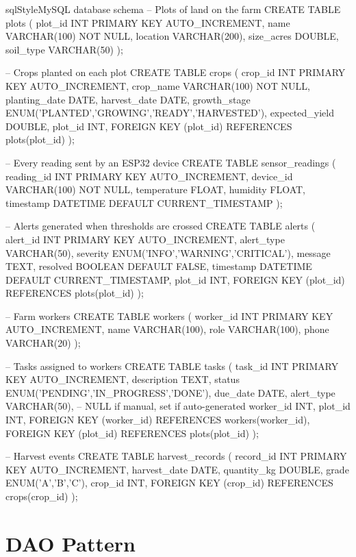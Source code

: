 \documentclass[12pt, a4paper]{report}
\begin{document}
\begin{codeblock}{sqlStyle}{MySQL database schema}
-- Plots of land on the farm
CREATE TABLE plots (
    plot_id    INT PRIMARY KEY AUTO_INCREMENT,
    name       VARCHAR(100) NOT NULL,
    location   VARCHAR(200),
    size_acres DOUBLE,
    soil_type  VARCHAR(50)
);

-- Crops planted on each plot
CREATE TABLE crops (
    crop_id          INT PRIMARY KEY AUTO_INCREMENT,
    crop_name        VARCHAR(100) NOT NULL,
    planting_date    DATE,
    harvest_date     DATE,
    growth_stage     ENUM('PLANTED','GROWING','READY','HARVESTED'),
    expected_yield   DOUBLE,
    plot_id          INT,
    FOREIGN KEY (plot_id) REFERENCES plots(plot_id)
);

-- Every reading sent by an ESP32 device
CREATE TABLE sensor_readings (
    reading_id  INT PRIMARY KEY AUTO_INCREMENT,
    device_id   VARCHAR(100) NOT NULL,
    temperature FLOAT,
    humidity    FLOAT,
    timestamp   DATETIME DEFAULT CURRENT_TIMESTAMP
);

-- Alerts generated when thresholds are crossed
CREATE TABLE alerts (
    alert_id   INT PRIMARY KEY AUTO_INCREMENT,
    alert_type VARCHAR(50),
    severity   ENUM('INFO','WARNING','CRITICAL'),
    message    TEXT,
    resolved   BOOLEAN DEFAULT FALSE,
    timestamp  DATETIME DEFAULT CURRENT_TIMESTAMP,
    plot_id    INT,
    FOREIGN KEY (plot_id) REFERENCES plots(plot_id)
);

-- Farm workers
CREATE TABLE workers (
    worker_id INT PRIMARY KEY AUTO_INCREMENT,
    name      VARCHAR(100),
    role      VARCHAR(100),
    phone     VARCHAR(20)
);

-- Tasks assigned to workers
CREATE TABLE tasks (
    task_id     INT PRIMARY KEY AUTO_INCREMENT,
    description TEXT,
    status      ENUM('PENDING','IN_PROGRESS','DONE'),
    due_date    DATE,
    alert_type  VARCHAR(50), -- NULL if manual, set if auto-generated
    worker_id   INT,
    plot_id     INT,
    FOREIGN KEY (worker_id) REFERENCES workers(worker_id),
    FOREIGN KEY (plot_id)   REFERENCES plots(plot_id)
);

-- Harvest events
CREATE TABLE harvest_records (
    record_id    INT PRIMARY KEY AUTO_INCREMENT,
    harvest_date DATE,
    quantity_kg  DOUBLE,
    grade        ENUM('A','B','C'),
    crop_id      INT,
    FOREIGN KEY (crop_id) REFERENCES crops(crop_id)
);
\end{codeblock}

\section{DAO Pattern}
\end{document}
